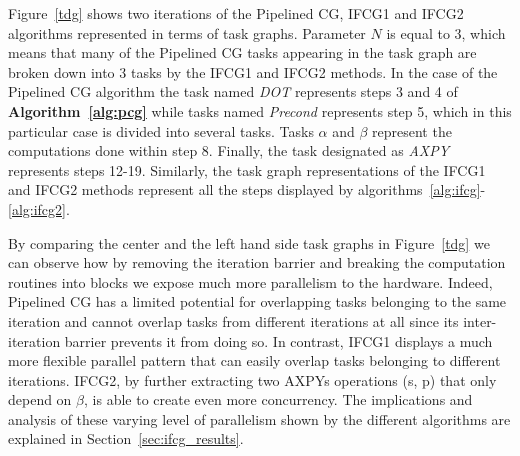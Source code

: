 Figure~\ref{tdg} shows two iterations of the Pipelined CG, IFCG1 and IFCG2 algorithms represented in terms of task graphs.
Parameter $N$ is equal to $3$, which means that many of the Pipelined CG tasks appearing in the task graph are broken down
into 3 tasks by the IFCG1 and IFCG2 methods.
In the case of the Pipelined CG algorithm the task named \emph{DOT} represents steps 3 and 4 of {\bf Algorithm~\ref{alg:pcg}} while tasks named \emph{Precond} represents step 5, which in this particular case is divided into several tasks. 
Tasks $\alpha$ and $\beta$ represent the computations done within step 8.
Finally, the task designated as \emph{AXPY} represents steps 12-19.
Similarly, the task graph representations of the IFCG1 and IFCG2 methods represent all the steps displayed by algorithms~\ref{alg:ifcg}-\ref{alg:ifcg2}.

By comparing the center and the left hand side task graphs in Figure~\ref{tdg} we can observe how by removing the iteration barrier and breaking the computation routines into 
blocks we expose much more parallelism to the hardware. 
Indeed, Pipelined CG has a limited potential for overlapping tasks belonging to the same iteration and cannot overlap tasks from different iterations at all since its inter-iteration barrier prevents it from doing so.
In contrast, IFCG1 displays a much more flexible parallel pattern that can easily overlap tasks belonging to different iterations.
IFCG2, by further extracting two AXPYs operations (s, p) that only depend on $\beta$, is able to create even more concurrency.
The implications and analysis of these varying level of parallelism shown by the different algorithms are explained in Section~\ref{sec:ifcg_results}.

\begin{table}[H]
\fontsize{9}{9}\selectfont
\centering
{}
\vspace{0.2cm}
\caption{Matrices used for experiments}
\label{table:ifcg_matrices}
\vspace{-0.5cm}
\end{table}
